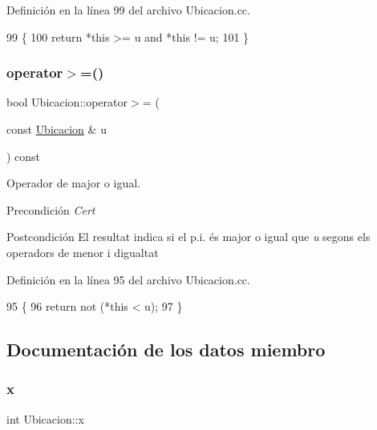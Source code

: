 Definición en la línea 99 del archivo Ubicacion.\+cc.


\begin{DoxyCode}
99                                                   \{
100   \textcolor{keywordflow}{return} *\textcolor{keyword}{this} >= u and *\textcolor{keyword}{this} != u;
101 \}
\end{DoxyCode}
\mbox{\label{class_ubicacion_a0ea3b04b8b0ef5a3482049d3ddf63f3b}} 
\subsubsection{\texorpdfstring{operator$>$=()}{operator>=()}}
{\footnotesize\ttfamily bool Ubicacion\+::operator$>$= (\begin{DoxyParamCaption}\item[{const \hyperlink{class_ubicacion}{Ubicacion} \&}]{u }\end{DoxyParamCaption}) const}



Operador de major o igual. 

\begin{DoxyPrecond}{Precondición}
{\itshape Cert} 
\end{DoxyPrecond}
\begin{DoxyPostcond}{Postcondición}
El resultat indica si el p.\+i. és major o igual que {\itshape u} segons els operadors de menor i d\textquotesingle{}igualtat 
\end{DoxyPostcond}


Definición en la línea 95 del archivo Ubicacion.\+cc.


\begin{DoxyCode}
95                                                    \{
96   \textcolor{keywordflow}{return} not (*\textcolor{keyword}{this} < u);
97 \}
\end{DoxyCode}


\subsection{Documentación de los datos miembro}
\mbox{\label{class_ubicacion_aa025967df0ca8761587b09a38cf5b798}} 
\subsubsection{\texorpdfstring{x}{x}}
{\footnotesize\ttfamily int Ubicacion\+::x\hspace{0.3cm}{\ttfamily [private]}}



